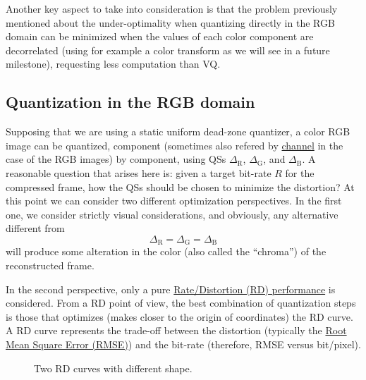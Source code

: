 Another key aspect to take into consideration is that the problem
previously mentioned about the under-optimality when quantizing
directly in the RGB domain can be minimized when the values of each
color component are decorrelated (using for example a color transform
as we will see in a future milestone), requesting less computation
than VQ.

\subsection{Quantization in the RGB domain}
Supposing that we are using a static uniform dead-zone quantizer, a
color RGB image can be quantized, component (sometimes also refered by
\href{https://en.wikipedia.org/wiki/Color_image}{channel} in the case
of the RGB images) by component, using QSs $\Delta_{\text{R}}$,
$\Delta_{\text{G}}$, and $\Delta_{\text{B}}$. A reasonable question
that arises here is: given a target bit-rate $R$ for the compressed
frame, how the QSs should be chosen to minimize the distortion? At
this point we can consider two different optimization perspectives. In
the first one, we consider strictly visual considerations, and
obviously, any alternative different from
\begin{equation}
  \Delta_{\text{R}} = \Delta_{\text{G}} = \Delta_{\text{B}}
  \label{eq:simple_Q}
\end{equation}
will produce some alteration in the color (also called the
``chroma'') of the reconstructed frame.

In the second perspective, only a pure
\href{https://en.wikipedia.org/wiki/Rate-distortion_theory}{Rate/Distortion
  (RD) performance} is considered. From a RD point of view, the best
combination of quantization steps is those that optimizes
(makes closer to the origin of coordinates) the RD curve. A RD curve
represents the trade-off between the distortion (typically the
\href{https://en.wikipedia.org/wiki/Root-mean-square_deviation}{Root
  Mean Square Error (RMSE)}) and the bit-rate (therefore, RMSE versus
bit/pixel).

\begin{figure}
  \centering
  \caption{Two RD curves with different shape.}
  \label{fig:RD_slopes}
\end{figure}

